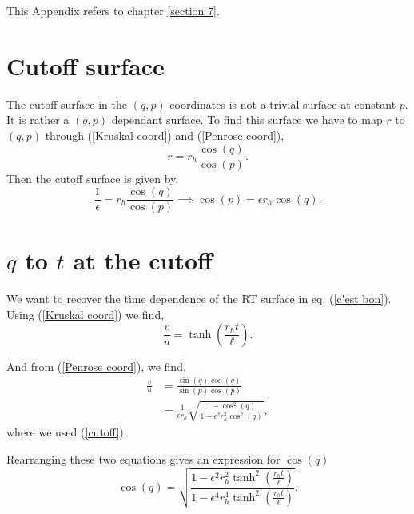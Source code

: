 This Appendix refers to chapter \ref{section 7}.

\section{Cutoff surface}

The cutoff surface in the $(q,p)$ coordinates is not a trivial surface at constant $p$. It is rather a $(q,p)$ dependant surface. To find this surface we have to map $r$ to $(q,p)$ through (\ref{Kruskal coord}) and (\ref{Penrose coord}),
\begin{equation}
    r = r_h\frac{\cos(q)}{\cos(p)}.
\end{equation}
Then the cutoff surface is given by,
\begin{equation}\label{cutoff}
    \frac{1}{\epsilon} = r_h\frac{\cos(q)}{\cos(p)}\implies \cos(p)=\epsilon r_h \cos(q).
\end{equation}

\section{$q$ to $t$ at the cutoff}

We want to recover the time dependence of the RT surface in eq. (\ref{c'est bon}). Using (\ref{Kruskal coord}) we find,
\begin{equation}
    \frac{v}{u} = \tanh\left(\frac{r_h t}{\ell}\right).
\end{equation}

And from (\ref{Penrose coord}), we find,
\begin{align}
    \frac{v}{u} &= \frac{\sin(q)\cos(q)}{\sin(p)\cos(p)}\\
    &= \frac{1}{\epsilon r_h}\sqrt{\frac{1-\cos^2(q)}{1-\epsilon^2r_h^2\cos^2(q)}},
\end{align}
where we used (\ref{cutoff}).

Rearranging these two equations gives an expression for $\cos(q)$
\begin{equation}
    \cos(q)=\sqrt{\frac{1-\epsilon^2r_h^2\tanh^2\left(\frac{r_h t}{\ell}\right)}{1-\epsilon^4r_h^4\tanh^2\left(\frac{r_h t}{\ell}\right)}}.
\end{equation}
